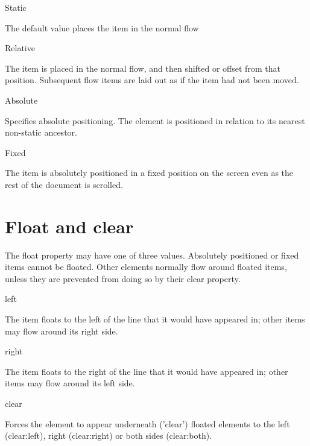 \begin{compactitem}
\item Static

The default value places the item in the normal flow

\item Relative

The item is placed in the normal flow, and then shifted or offset from that position. Subsequent flow items are laid out as if the item had not been moved.

\item Absolute

Specifies absolute positioning. The element is positioned in relation to its nearest non-static ancestor.

\item Fixed

The item is absolutely positioned in a fixed position on the screen even as the rest of the document is scrolled.


\end{compactitem}


\section{Float and clear}


The float property may have one of three values. Absolutely positioned or fixed items cannot be floated. Other elements normally flow around floated items, unless they are prevented from doing so by their clear property.


\begin{compactitem}
\item left

The item floats to the left of the line that it would have appeared in; other items may flow around its right side.

\item right

The item floats to the right of the line that it would have appeared in; other items may flow around its left side.

\item clear

Forces the element to appear underneath ('clear') floated elements to the left (clear:left), right (clear:right) or both sides (clear:both).


\end{compactitem}









